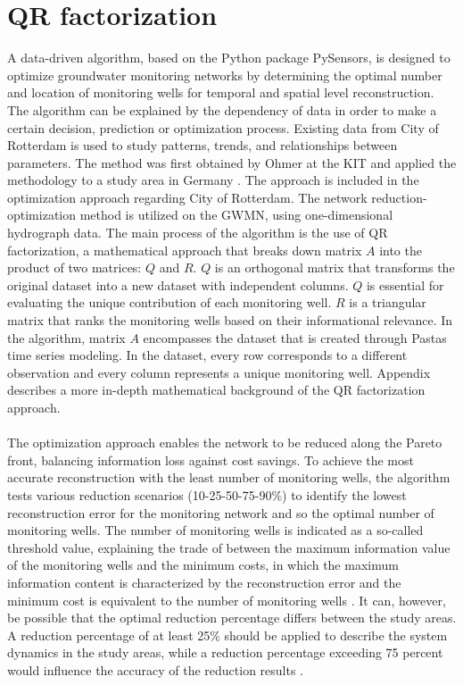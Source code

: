 \section{QR factorization}
A data-driven algorithm, based on the Python package PySensors, is designed to optimize groundwater monitoring networks by determining the optimal number and location of monitoring wells for temporal and spatial level reconstruction. The algorithm can be explained by the dependency of data in order to make a certain decision, prediction or optimization process. Existing data from City of Rotterdam is used to study patterns, trends, and relationships between parameters. The method was first obtained by Ohmer at the KIT and applied the methodology to a study area in Germany \cite{ohmer-2022}. The approach is included in the optimization approach regarding City of Rotterdam. The network reduction-optimization method is utilized on the GWMN, using one-dimensional hydrograph data. The main process of the algorithm is the use of QR factorization, a mathematical approach that breaks down matrix \(A\) into the product of two matrices: \(Q\) and \(R\). \(Q\) is an orthogonal matrix that transforms the original dataset into a new dataset with independent columns. \(Q\) is essential for evaluating the unique contribution of each monitoring well. \(R\) is a triangular matrix that ranks the monitoring wells based on their informational relevance. In the algorithm, matrix \(A\) encompasses the dataset that is created through Pastas time series modeling. In the dataset, every row corresponds to a different observation and every column represents a unique monitoring well. Appendix  describes a more in-depth mathematical background of the QR factorization approach. \\
\\
The optimization approach enables the network to be reduced along the Pareto front, balancing information loss against cost savings. To achieve the most accurate reconstruction with the least number of monitoring wells, the algorithm tests various reduction scenarios (10-25-50-75-90\%) to identify the lowest reconstruction error for the monitoring network and so the optimal number of monitoring wells. The number of monitoring wells is indicated as a so-called threshold value, explaining the trade of between the maximum information value of the monitoring wells and the minimum costs, in which the maximum information content is characterized by the reconstruction error and the minimum cost is equivalent to the number of monitoring wells \cite{wu-2004}. It can, however, be possible that the optimal reduction percentage differs between the study areas. A reduction percentage of at least 25\% should be applied to describe the system dynamics in the study areas, while a reduction percentage exceeding 75 percent would influence the accuracy of the reduction results \cite{ohmer-2022}. \\
